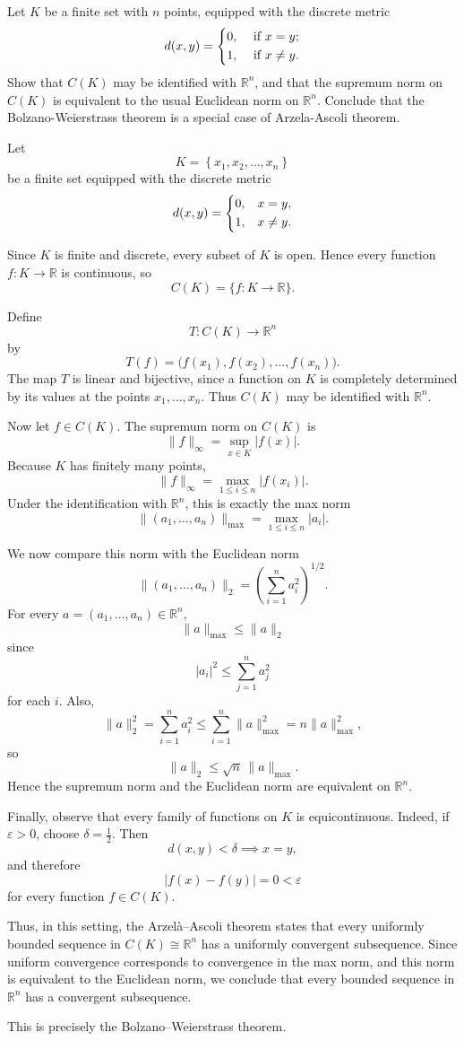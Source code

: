 \begin{eg}
    Let \(K\) be a finite set with \(n\) points, equipped with the discrete metric 
    \[
        d(x, y) = \begin{dcases}
            0, &\text{ if } x = y ;\\
            1, &\text{ if } x \neq y.
        \end{dcases}
    \]  
    Show that \(C(K)\) may be identified with \(\mathbb{R} ^n\), and that the supremum norm on \(C(K)\) is equivalent to the usual Euclidean norm on \(\mathbb{R} ^n\). Conclude that the Bolzano-Weierstrass theorem is a special case of Arzela-Ascoli theorem.     
\end{eg}

\begin{explanation}
    Let 
\[
K = \left\{ x_1, x_2, \dots , x_n \right\}
\]
be a finite set equipped with the discrete metric
\[
d(x,y)=
\begin{dcases}
0,&x=y,\\
1,&x\neq y.
\end{dcases}
\]

Since \(K\) is finite and discrete, every subset of \(K\) is open. Hence every function \(f:K\to\mathbb R\) is continuous, so
\[
C(K)=\{f:K\to\mathbb R\}.
\]

Define
\[
T:C(K)\to\mathbb R^n
\]
by
\[
T(f)=\bigl(f(x_1),f(x_2),\dots,f(x_n)\bigr).
\]
The map \(T\) is linear and bijective, since a function on \(K\) is completely determined by its values at the points \(x_1,\dots,x_n\). Thus \(C(K)\) may be identified with \(\mathbb R^n\).

Now let \(f\in C(K)\). The supremum norm on \(C(K)\) is
\[
\|f\|_\infty
=
\sup_{x\in K}|f(x)|.
\]
Because \(K\) has finitely many points,
\[
\|f\|_\infty
=
\max_{1\le i\le n}|f(x_i)|.
\]
Under the identification with \(\mathbb R^n\), this is exactly the max norm
\[
\|(a_1,\dots,a_n)\|_{\max}
=
\max_{1\le i\le n}|a_i|.
\]

We now compare this norm with the Euclidean norm
\[
\|(a_1,\dots,a_n)\|_2
=
\left(\sum_{i=1}^n a_i^2\right)^{1/2}.
\]
For every \(a=(a_1,\dots,a_n)\in\mathbb R^n\),
\[
\|a\|_{\max}\le \|a\|_2
\]
since
\[
|a_i|^2\le \sum_{j=1}^n a_j^2
\]
for each \(i\). Also,
\[
\|a\|_2^2
=
\sum_{i=1}^n a_i^2
\le
\sum_{i=1}^n \|a\|_{\max}^2
=
n\|a\|_{\max}^2,
\]
so
\[
\|a\|_2\le \sqrt n\,\|a\|_{\max}.
\]
Hence the supremum norm and the Euclidean norm are equivalent on \(\mathbb R^n\).

Finally, observe that every family of functions on \(K\) is equicontinuous. Indeed, if \(\varepsilon>0\), choose \(\delta=\frac12\). Then
\[
d(x,y)<\delta
\implies x=y,
\]
and therefore
\[
|f(x)-f(y)|=0<\varepsilon
\]
for every function \(f\in C(K)\).

Thus, in this setting, the Arzelà--Ascoli theorem states that every uniformly bounded sequence in \(C(K)\cong\mathbb R^n\) has a uniformly convergent subsequence. Since uniform convergence corresponds to convergence in the max norm, and this norm is equivalent to the Euclidean norm, we conclude that every bounded sequence in \(\mathbb R^n\) has a convergent subsequence.

This is precisely the Bolzano--Weierstrass theorem.
\end{explanation}
